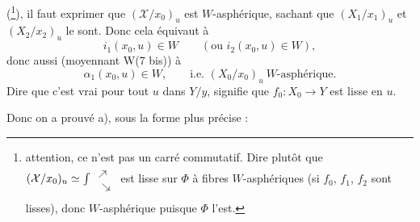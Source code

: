 (\footnote[107]{attention, ce n'est pas un carré commutatif. Dire plutôt que $(\mathcal{X}/x_0)_u \simeq \int \begin{tikzcd}[ampersand replacement=\&, row sep=0.4em, column sep=0.4em, baseline=(\tikzcdmatrixname-2-1.base)] \& {} \\ {} \ar[ur]\ar[dr] \& \\ \& {} \end{tikzcd}$ est lisse sur $\Phi$ à fibres $W$-asphériques (si $f_0$, $f_1$, $f_2$ sont lisses), donc $W$-asphérique puisque $\Phi$ l'est.}), il faut exprimer que $(\mathcal{X}/x_0)_u$ est $W$-asphérique, sachant que $(X_1/x_1)_u$ et $(X_2/x_2)_u$ le sont. Donc cela équivaut à %
\[
i_1(x_0,u) \in W \qquad (\text{ou } i_2(x_0,u) \in W),
\]
donc aussi (moyennant W(7 bis)) à
\[
\alpha_1(x_0,u) \in W, \qquad \text{i.e. } (X_0/x_0)_u \ W\text{-asphérique.}
\]
Dire que c'est vrai pour tout $u$ dans $Y/y$, signifie que $f_0 : X_0 \longrightarrow Y$ est lisse en $u$.

Donc on a prouvé a), sous la forme plus précise :

